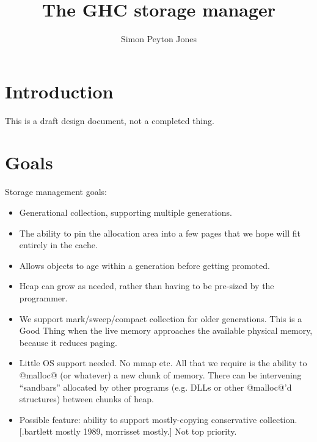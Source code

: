 \documentclass{article}
\begin{document}
\title{The GHC storage manager}
\author{Simon Peyton Jones}

\makeatactive
\maketitle

\section{Introduction}

This is a draft design document, not a completed thing.

\section{Goals}

Storage management goals:

\begin{itemize}
\item Generational collection, supporting multiple generations.

\item The ability to pin the allocation
area into a few pages that we hope will fit entirely in the cache.

\item Allows objects to age within a generation before getting promoted.

\item Heap can grow as needed, rather than having to be pre-sized
  by the programmer.

\item We support mark/sweep/compact collection for older generations.
This is a Good Thing when the live memory approaches the available
physical memory, because it reduces paging.

\item Little OS support needed.  No mmap etc. All that we require is
  the ability to @malloc@ (or whatever) a new chunk of memory.
  There can be intervening ``sandbars'' allocated by other programs
  (e.g. DLLs or other @malloc@'d structures) between chunks of heap.

\item Possible feature: ability to support mostly-copying conservative 
collection.[.bartlett mostly 1989, morrisset mostly.]
Not top priority.
\end{itemize}
\end{document}
